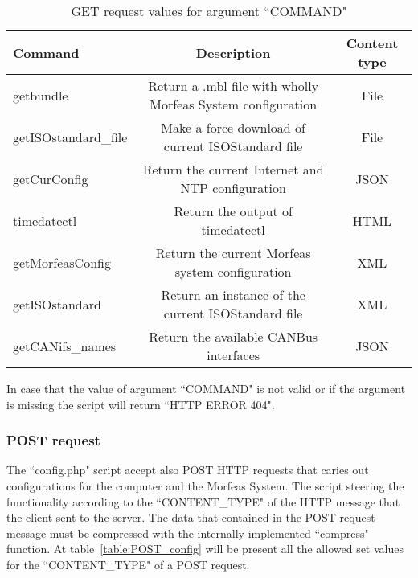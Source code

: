 \begin{table}[h]
\centering
\begin{tabular}{|l|c|c|}
 \hline
 \textbf{Command} & \textbf{Description} & \textbf{Content type}\\
 \hline
 getbundle & Return a .mbl file with wholly Morfeas System configuration & File \\
 getISOstandard\_file & Make a force download of current ISOStandard file & File \\
 getCurConfig & Return the current Internet and NTP configuration& JSON \\
 timedatectl & Return the output of timedatectl & HTML \\
 getMorfeasConfig & Return the current Morfeas system configuration & XML \\
 getISOstandard & Return an instance of the current ISOStandard file & XML \\
 getCANifs\_names & Return the available CANBus interfaces & JSON \\
 \hline
\end{tabular}
\caption{GET request values for argument ``COMMAND"}
\label{table:GET_config}
\end{table}

In case that the value of argument ``COMMAND" is not valid or if the argument is missing the script will return ``HTTP ERROR 404".

\subsubsection{POST request}

The ``config.php" script accept also POST HTTP requests that caries out configurations for the computer and the Morfeas System.
The script steering the functionality according to the ``CONTENT\_TYPE" of the HTTP message that the client sent to the server.
The data that contained in the POST request message must be compressed with the internally implemented ``compress" function.
At table~\ref{table:POST_config} will be present all the allowed set values for the ``CONTENT\_TYPE" of a POST request.

